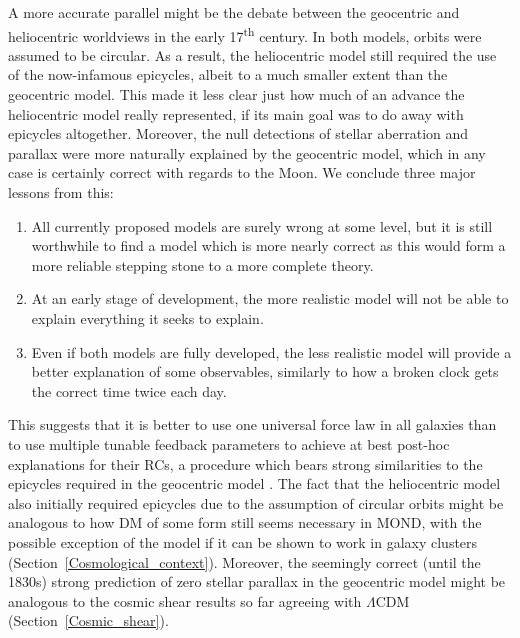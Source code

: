 \documentclass[fleqn,usenatbib,useAMS]{mnras} %
\begin{document}
A more accurate parallel might be the debate between the geocentric and heliocentric worldviews in the early 17\textsuperscript{th} century. In both models, orbits were assumed to be circular. As a result, the heliocentric model still required the use of the now-infamous epicycles, albeit to a much smaller extent than the geocentric model. This made it less clear just how much of an advance the heliocentric model really represented, if its main goal was to do away with epicycles altogether. Moreover, the null detections of stellar aberration and parallax were more naturally explained by the geocentric model, which in any case is certainly correct with regards to the Moon. We conclude three major lessons from this:
\begin{enumerate}
	\item All currently proposed models are surely wrong at some level, but it is still worthwhile to find a model which is more nearly correct as this would form a more reliable stepping stone to a more complete theory.
	\item At an early stage of development, the more realistic model will not be able to explain everything it seeks to explain.
	\item Even if both models are fully developed, the less realistic model will provide a better explanation of some observables, similarly to how a broken clock gets the correct time twice each day.
\end{enumerate}

This suggests that it is better to use one universal force law in all galaxies than to use multiple tunable feedback parameters to achieve at best post-hoc explanations for their RCs, a procedure which bears strong similarities to the epicycles required in the geocentric model \citep{Merritt_2020}. The fact that the heliocentric model also initially required epicycles due to the assumption of circular orbits might be analogous to how DM of some form still seems necessary in MOND, with the possible exception of the \citet{Skordis_2021} model if it can be shown to work in galaxy clusters (Section~\ref{Cosmological_context}). Moreover, the seemingly correct (until the 1830s) strong prediction of zero stellar parallax in the geocentric model might be analogous to the cosmic shear results so far agreeing with $\Lambda$CDM (Section~\ref{Cosmic_shear}).
\end{document}

